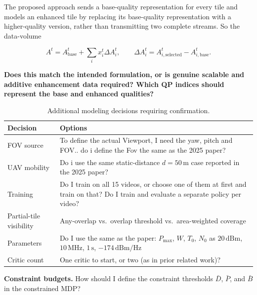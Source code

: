 \documentclass[10pt,conference]{IEEEtran}
\begin{document}
The proposed approach sends a base-quality representation
for every tile and models an enhanced tile by replacing its base-quality
representation with a higher-quality version, rather than transmitting two
complete streams. So the data-volume

\[
A^t
=
A_{\text{base}}^t
+
\sum_i x_i^t\Delta A_i^t,
\qquad
\Delta A_i^t
=
A_{i,\text{selected}}^t-A_{i,\text{base}}^t.
\]

\noindent
\textbf{Does this match the intended formulation, or is genuine scalable
and additive enhancement data required? Which QP indices should represent
the base and enhanced qualities?}

\begin{table}[H]
    \centering
    \footnotesize
    \begin{tabular}{@{}p{2.1cm}p{5.3cm}@{}}
        \toprule
        \textbf{Decision} & \textbf{Options} \\
        \midrule

        FOV source &
        To define the actual Viewport, I need the yaw, pitch and FOV.. do i define the Fov the same as the 2025 paper?\\

        UAV mobility &
        Do i use the same static-distance $d=50\,\mathrm{m}$ case
        reported in the 2025 paper? \\

        Training &
        Do I train on all 15 videos, or choose one of them at first and train on that? Do I train and evaluate a separate policy per video?\\

        Partial-tile visibility &
        Any-overlap vs.\ overlap threshold vs.\ area-weighted coverage \\

        Parameters &
        Do I use the same as the paper: $P_{\max}$, $W$, $T_0$, $N_0$ as $20\,\mathrm{dBm}$, $10\,\mathrm{MHz}$, $1\,\mathrm{s}$, $-174\,\mathrm{dBm/Hz}$\\

        Critic count &
        One critic to start, or two (as in prior related work)?\\

        \bottomrule
    \end{tabular}
    \caption{Additional modeling decisions requiring confirmation.}
    \label{tab:decisions}
\end{table}
\noindent
\textbf{Constraint budgets.}
How should I define the constraint thresholds $\bar{D}$, $\bar{P}$, and $\bar{B}$ in the constrained MDP?
\end{document}
